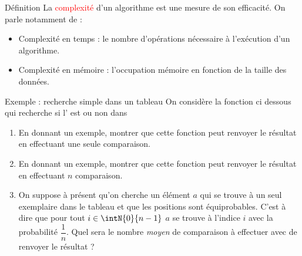 \documentclass[10pt]{beamer}
\begin{document}
\begin{frame}[fragile]{\Ctitle}{\stitle}
    \begin{alertblock}{Définition}
        La \textcolor{red}{complexité} d'un algorithme est une mesure de son efficacité.
         On parle notamment de :
        \begin{itemize}
            \item<3-> Complexité en temps : le nombre d'opérations nécessaire à l'exécution d'un algorithme.
            \item<4-> Complexité en mémoire : l'occupation mémoire en fonction de la taille des données.
        \end{itemize}
    \end{alertblock}
\end{frame}


\begin{frame}[fragile]{\Ctitle}{\stitle}
    \begin{exampleblock}{Exemple : recherche simple dans un tableau}
        {\small On considère la fonction ci dessous qui recherche si l' est ou non dans {}}
    \begin{enumerate}
        \item<3-> {\small En donnant un exemple, montrer que cette fonction peut renvoyer le résultat en effectuant une seule comparaison.}
        \item<4-> {\small En donnant un exemple, montrer que cette fonction peut renvoyer le résultat en effectuant $n$ comparaison.}
        \item<5-> {\small On suppose à présent qu'on cherche un élément $a$ qui se trouve à un seul exemplaire dans le tableau et que les positions sont équiprobables. C'est à dire que pour tout $i \in \intN{0}{n-1}$ $a$ se trouve à l'indice $i$ avec la probabilité $\dfrac{1}{n}$. Quel sera le nombre \textit{moyen} de comparaison à effectuer avec de renvoyer le résultat ?}
    \end{enumerate}
\end{exampleblock}
\end{frame}
\end{document}
